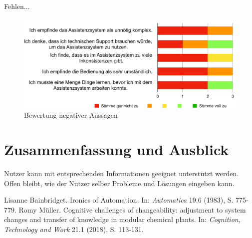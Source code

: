 \documentclass{ifaPoster}
\begin{document}
Fehlen...

\begin{figure}[htb]
\centering
\includegraphics[scale=0.8]{DA_files/SUS-negativ.pdf}
\caption{Bewertung negativer Aussagen}
\end{figure}


\section{Zusammenfassung und Ausblick}
Nutzer kann mit entsprechenden Informationen geeignet unterstützt werden. Offen bleibt, wie der Nutzer selber Probleme und Lösungen eingeben kann.


 {\tiny\renewcommand{\section}[2]{}%
 	 \begin{thebibliography}{8.5}
 	 	Lisanne Bainbridget. {\glqq Ironies of Automation\grqq}. {In: \textit{Automatica}} 19.6 (1983), S. 775-779.
 	 Romy Müller. {\glqq Cognitive challenges of changeability: adjustment
to system changes and transfer of knowledge in modular
chemical plants\grqq}. {In: \textit{Cognition, Technology and Work}} 21.1 (2018), S. 113-131.
	\end{thebibliography}}
	
\end{document}
